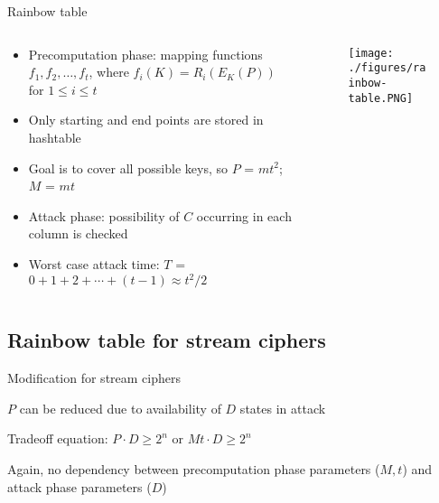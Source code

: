 \documentclass{beamer}
\begin{document}
\begin{frame}{Rainbow table}

\begin{columns}
\begin{column}{5cm}
\footnotesize{
\begin{itemize}
	\item Precomputation phase: mapping functions \mbox{$f_1, f_2, \ldots , f_t$}, where $f_i(K) = R_i(E_{K}(P))$ for $1 \leq i \leq t$
	\item Only starting and end points are stored in hashtable
	\item Goal is to cover all possible keys, so $P$ = $mt^2$; $M$ = $mt$
	\item Attack phase: possibility of $C$ occurring in each column is checked
	\item Worst case attack time: $T$ = $0 + 1 + 2 + \cdots + (t-1) \approx t^2/2$
	
\end{itemize}}
\end{column}

\begin{column}{5cm}
	\begin{figure}[htp]
	\centering
	\texttt{[image: ./figures/rainbow-table.PNG]}
	\end{figure}

\end{column}
\end{columns}

\end{frame}

\subsection{Rainbow table for stream ciphers}

\begin{frame}{Modification for stream ciphers}
\begin{itemize}
\footnotesize{
	\item $P$ can be reduced due to availability of $D$ states in attack
	\item Tradeoff equation: $P \cdot D \geq 2^n$ or $Mt \cdot D \geq 2^n$
	\item Again, no dependency between precomputation phase parameters ($M,t$) and attack phase parameters ($D$)	
}\end{itemize}
\end{frame}
\end{document}
